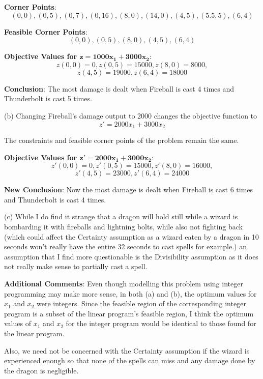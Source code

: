 \documentclass{article}
\begin{document}
\begin{enumerate}
   \textbf{Corner Points}: 
   $$(0,0), (0,5), (0, 7), (0, 16), (8,0), (14,0), (4,5), (5.5,5), (6,4)$$
   
   \textbf{Feasible Corner Points}:
   $$(0,0), (0,5),  (8,0), (4,5), (6,4)$$
   
   \textbf{Objective Values for $\mathbf{z = 1000x_1 + 3000x_2}$}:
   $$z(0,0) = 0, z(0,5) = 15000, z(8,0) = 8000,$$
   $$z(4,5) = 19000, z(6,4) = 18000$$
   
   \textbf{Conclusion}: The most damage is dealt when Fireball is cast 4 times and Thunderbolt is cast 5 times. \newline{}
   
   (b) Changing Fireball's damage output to 2000 changes the objective function to
   $$z' = 2000x_1 + 3000x_2$$
   
  The constraints and feasible corner points of the problem remain the same.
  
   \textbf{Objective Values for $\mathbf{z' = 2000x_1 + 3000x_2}$}:
   $$z'(0,0) = 0, z'(0,5) = 15000, z'(8,0) = 16000,$$
   $$z'(4,5) = 23000, z'(6,4) = 24000$$
   
   \textbf{New Conclusion}: Now the most damage is dealt when Fireball is cast 6 times and Thunderbolt is cast 4 times.
   
   (c) While I do find it strange that a dragon will hold still while a wizard is bombarding it with fireballs and lightning bolts,
   while also not fighting back (which could affect the Certainty assumption as a wizard eaten by a dragon in 10 seconds won't really
   have the entire 32 seconds to cast spells for example.) an assumption that I find more questionable is the Divisibility assumption
   as it does not really make sense to partially cast a spell. 
   
   \textbf{Additional Comments}: Even though modelling this problem using integer programming may make more sense, in both (a) and (b),
   the optimum values for $x_1$ and $x_2$ were integers. Since the feasible region of the corresponding integer program is a subset of the
   linear program's feasible region, I think the optimum values of $x_1$ and $x_2$ for the integer program would be identical to those found
   for the linear program.
   
   Also, we need not be concerned with the Certainty assumption if the wizard is experienced enough so that none of the spells can miss and any damage
   done by the dragon is negligible. 
  \end{enumerate}
\end{document}
